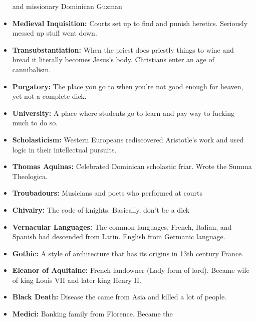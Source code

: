 \documentclass[crop=false,class=book]{standalone}
\begin{document}
\begin{itemize}[noitemsep]
                    and missionary Dominican Guzman
                \item \textbf{Medieval Inquisition:}
                    Courts set up to find and punish heretics.
                    Seriously messed up stuff went down.
                \item \textbf{Transubstantiation:}
                    When the priest does priestly things to wine and
                    bread it literally becomes Jesus’s body.
                    Christians enter an age of cannibalism.
                \item \textbf{Purgatory:}
                    The place you go to when you’re not good enough
                    for heaven, yet not a complete dick.
                \item \textbf{University:}
                    A place where students go to learn and pay way
                    to fucking much to do so.
                \item \textbf{Scholasticism:}
                    Western Europeans rediscovered Aristotle’s work
                    and used logic in their intellectual pursuits.
                \item \textbf{Thomas Aquinas:}
                    Celebrated Dominican scholastic friar.
                    Wrote the Summa Theologica.
                \item \textbf{Troubadours:}
                    Musicians and poets who performed at courts
                \item \textbf{Chivalry:}
                    The code of knights. Basically, don’t be a dick
                \item \textbf{Vernacular Languages:}
                    The common languages. French, Italian, and
                    Spanish had descended from Latin. English from
                    Germanic language.
                \item \textbf{Gothic:}
                    A style of architecture that has its origins
                    in 13th century France.
                \item \textbf{Eleanor of Aquitaine:}
                    French landowner (Lady form of lord). Became
                    wife of king Louis VII and later king Henry II.
                \item \textbf{Black Death:}
                    Disease the came from Asia and killed a
                    lot of people.
                \item \textbf{Medici:}
                    Banking family from Florence. Became the

\end{itemize}
\end{document}
